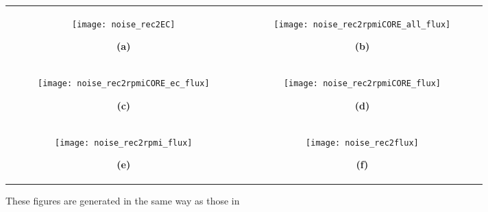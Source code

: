 \begin{figure}
\hspace{-2cm}
\begin{tabular}{cc}
  \begin{subfigure}[b]{0.5\textwidth}
  \texttt{[image: noise\_rec2EC]}
  \vspace{3mm} \caption*{\hspace*{4cm}\textbf{(a)}} \label{fig:ExpSensRec2:A}
  \end{subfigure}
&
  \begin{subfigure}[b]{0.5\textwidth}
  \texttt{[image: noise\_rec2rpmiCORE\_all\_flux]}
  \vspace{3mm} \caption*{\hspace*{4cm}\textbf{(b)}} \label{fig:ExpSensRec2:B}
  \end{subfigure} 
\\
  \begin{subfigure}[b]{0.5\textwidth}
  \texttt{[image: noise\_rec2rpmiCORE\_ec\_flux]}
  \vspace{3mm} \caption*{\hspace*{4cm}\textbf{(c)}} \label{fig:ExpSensRec2:C}
  \end{subfigure} 
&
  \begin{subfigure}[b]{0.5\textwidth}
  \texttt{[image: noise\_rec2rpmiCORE\_flux]}
  \vspace{3mm} \caption*{\hspace*{4cm}\textbf{(d)}} \label{fig:ExpSensRec2:D}
  \end{subfigure} 
\\
  \begin{subfigure}[b]{0.5\textwidth}
  \texttt{[image: noise\_rec2rpmi\_flux]}
  \vspace{3mm} \caption*{\hspace*{4cm}\textbf{(e)}} \label{fig:ExpSensRec2:E}
  \end{subfigure} 
&
  \begin{subfigure}[b]{0.5\textwidth}
  \texttt{[image: noise\_rec2flux]}
  \vspace{3mm} \caption*{\hspace*{4cm}\textbf{(f)}} \label{fig:ExpSensRec2:F}
  \end{subfigure} 
\\
\end{tabular}
\vspace{4mm}
\caption{ These figures are generated in the same way as those in
}
\end{figure}
